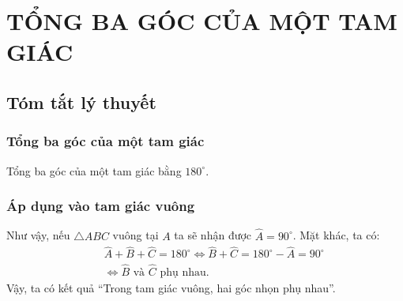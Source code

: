 \section{TỔNG BA GÓC CỦA MỘT TAM GIÁC}
\subsection{Tóm tắt lý thuyết}
\subsubsection{Tổng ba góc của một tam giác}
Tổng ba góc của một tam giác bằng $180^\circ$.
\subsubsection{Áp dụng vào tam giác vuông}
\begin{nx}
	Như vậy, nếu $\triangle ABC$ vuông tại $A$ ta sẽ nhận được $\widehat{A}=90^\circ$. Mặt khác, ta có: 
	\begin{eqnarray*}
		& &\widehat{A}+\widehat{B}+\widehat{C}=180^\circ\Leftrightarrow \widehat{B}+\widehat{C}=180^\circ-\widehat{A}=90^\circ\\
		& &\Leftrightarrow \widehat{B}\text{ và }\widehat{C}\text{ phụ nhau.}
	\end{eqnarray*}
	Vậy, ta có kết quả ``Trong tam giác vuông, hai góc nhọn phụ nhau''.
\end{nx}
